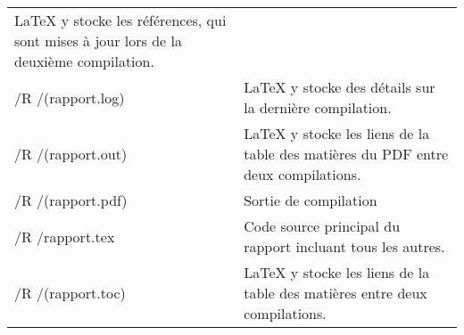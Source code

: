 \begin{onecolumn}
\begin{longtable}{>{\ttfamily}m{} p{}}
                                 LaTeX y stocke les références, qui
                                 sont mises à jour lors de la deuxième
                                 compilation.\\
    /R /(rapport.log)          & LaTeX y stocke des détails sur la
                                 dernière compilation.\\
    /R /(rapport.out)          & LaTeX y stocke les liens de la table
                                 des matières du PDF entre deux
                                 compilations.\\
    /R /(rapport.pdf)          & Sortie de compilation\\
    /R /rapport.tex            & Code source principal du rapport
                                 incluant tous les autres.\\
    /R /(rapport.toc)          & LaTeX y stocke les liens de la table
                                 des matières entre deux
                                 compilations.\\
\end{longtable}

\end{onecolumn}

\clearpage

\twocolumn

